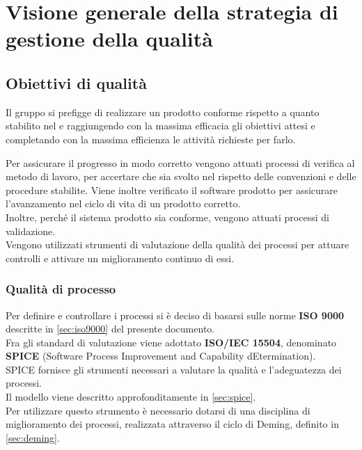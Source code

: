 \section{Visione generale della strategia di gestione della qualità}
\subsection{Obiettivi di qualità}
Il gruppo si prefigge di realizzare un prodotto conforme rispetto a quanto stabilito nel \PianoDiQualifica{} e \AnalisiDeiRequisiti{} raggiungendo con la massima efficacia gli obiettivi attesi e completando con la massima efficienza le attività richieste per farlo.

Per assicurare il progresso in modo corretto vengono attuati processi di verifica al metodo di lavoro, per accertare che sia svolto nel rispetto delle convenzioni e delle procedure stabilite. Viene inoltre verificato il software prodotto per assicurare l'avanzamento nel ciclo di vita di un prodotto corretto.\\
Inoltre, perché il sistema prodotto sia conforme, vengono attuati processi di validazione.\\
Vengono utilizzati strumenti di valutazione della qualità dei processi per attuare controlli e attivare un miglioramento continuo di essi.

\subsubsection{Qualità di processo}
Per definire e controllare i processi si è deciso di basarsi sulle norme \textbf{ISO 9000} descritte in \sezione\ref{sec:iso9000} del presente documento.\\
Fra gli standard di valutazione viene adottato \textbf{ISO/IEC 15504}, denominato \textbf{SPICE} (Software Process Improvement and Capability dEtermination).\\
SPICE fornisce gli strumenti necessari a valutare la qualità e l'adeguatezza dei processi.\\
Il modello viene descritto approfonditamente in \sezione\ref{sec:spice}.\\
Per utilizzare questo strumento è necessario dotarsi di una disciplina di miglioramento dei processi, realizzata attraverso il ciclo di Deming, definito in \sezione\ref{sec:deming}.

